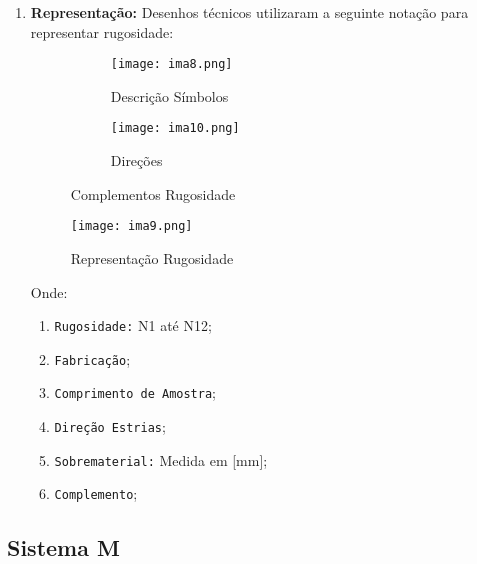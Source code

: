 \documentclass{article}
\begin{document}
\begin{enumerate}[rightmargin = \leftmargin, noitemsep]
                \item \textbf{Representação:} Desenhos técnicos utilizaram a seguinte notação para representar rugosidade:
                    \begin{figure}[H]
                        \begin{subfigure}[t]{0.60\textwidth}
                            \centering
                            \texttt{[image: ima8.png]}
                            \caption{Descrição Símbolos}
                        \end{subfigure}
                        \begin{subfigure}[t]{0.30\textwidth}
                            \centering
                            \texttt{[image: ima10.png]}
                            \caption{Direções}
                        \end{subfigure}
                        \caption{Complementos Rugosidade}
                    \end{figure}
                    \begin{figure}[H]
                        \centering
                        \texttt{[image: ima9.png]}
                        \caption{Representação Rugosidade}\label{fig:rugosidade}
                    \end{figure} \noindent
                Onde:
                    \begin{enumerate}[rightmargin = \leftmargin, noitemsep]
                        \item \texttt{Rugosidade:} N1 até N12;
                        \item \texttt{Fabricação};
                        \item \texttt{Comprimento de Amostra};
                        \item \texttt{Direção Estrias};
                        \item \texttt{Sobrematerial:} Medida em [mm];
                        \item \texttt{Complemento};
                    \end{enumerate}
            \end{enumerate}

        \subsection{Sistema M}
\end{document}
